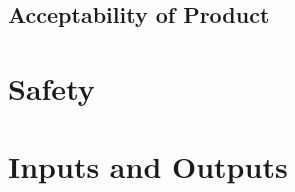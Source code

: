 \documentclass{../tex/report}
\begin{document}


\subsection{Acceptability of Product}



\section{Safety}





% 


\section{Inputs and Outputs}

\end{document}

